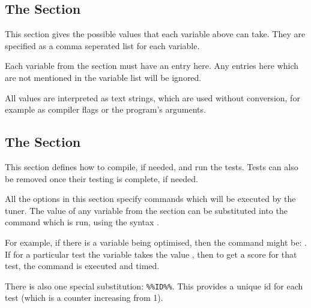 \documentclass[a4paper, draft]{article}
\begin{document}
\subsection{The \confsnippet{[values]} Section}
This section gives the possible values that each variable above can take. They 
are specified as a comma seperated list for each variable.

Each variable from the \confsnippet{[variables]} section must have an entry 
here. Any entries here which are not mentioned in the variable list will 
be ignored.

All values are interpreted as text strings, which are used without conversion, 
for example as compiler flags or the program's arguments.




\subsection{The \confsnippet{[testing]} Section}
This section defines how to compile, if needed, and run the tests. Tests can 
also be removed once their testing is complete, if needed.

All the options in this section specify commands which will be executed by the 
tuner. The value of any variable from the \confsnippet{[variables]} section 
can be substituted into the command which is run, using the syntax 
.

For example, if there is a variable  being optimised, then the 
 command might be: . 
If for a particular test the variable  takes the value , then 
to get a score for that test, the command  
is executed and timed.

There is also one special substitution: \texttt{\%\%ID\%\%}. 
This provides a unique id for each test (which is a counter increasing from 1).
\end{document}
